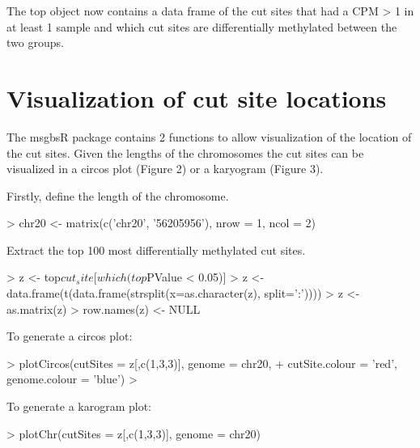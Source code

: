 \documentclass{article}
\begin{document}
The top object now contains a data frame of the cut sites that had a CPM > 1 in at least 1 sample and which cut sites are differentially methylated between the two groups.

\section{Visualization of cut site locations}

The msgbsR package contains 2 functions to allow visualization of the location of the cut sites. Given the lengths of the chromosomes the cut sites can be visualized in a circos plot (Figure 2) or a karyogram (Figure 3).

Firstly, define the length of the chromosome.
\begin{Schunk}
\begin{Sinput}
> chr20 <- matrix(c('chr20', '56205956'), nrow = 1, ncol = 2)
\end{Sinput}
\end{Schunk}

Extract the top 100 most differentially methylated cut sites.
\begin{Schunk}
\begin{Sinput}
> z <- top$cut_site[which(top$PValue < 0.05)]
> z <- data.frame(t(data.frame(strsplit(x=as.character(z), split=':'))))
> z <- as.matrix(z)
> row.names(z) <- NULL
\end{Sinput}
\end{Schunk}

To generate a circos plot:
\begin{Schunk}
\begin{Sinput}
> plotCircos(cutSites = z[,c(1,3,3)], genome = chr20,
+            cutSite.colour = 'red', genome.colour = 'blue')
> 
\end{Sinput}
\end{Schunk}

To generate a karogram plot:
\begin{Schunk}
\begin{Sinput}
> plotChr(cutSites = z[,c(1,3,3)], genome = chr20)
\end{Sinput}
\end{Schunk}
\end{document}
